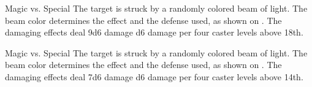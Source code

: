 \begin{spellheader}
\end{spellheader}
\begin{spelleffects}
    \begin{spellattack}{Magic vs. Special}
        \spellspecial The target is struck by a randomly colored beam of light. The beam color determines the effect and the defense used, as shown on . The damaging effects deal 9d6 damage \add d6 damage per four caster levels above 18th.
    \end{spellattack}
\end{spelleffects}
\begin{spellfooter}

\end{spellfooter}

\begin{spellheader}
\end{spellheader}
\begin{spelleffects}
    \begin{spellattack}{Magic vs. Special}
        \spellspecial The target is struck by a randomly colored beam of light. The beam color determines the effect and the defense used, as shown on . The damaging effects deal 7d6 damage \add d6 damage per four caster levels above 14th.
    \end{spellattack}
\end{spelleffects}
\begin{spellfooter}

\end{spellfooter}

